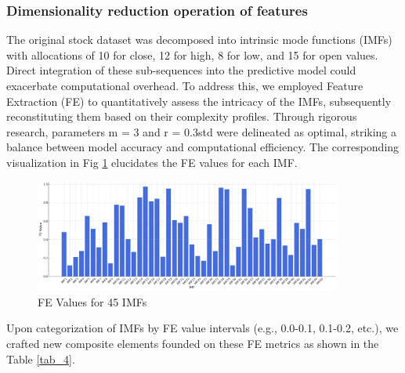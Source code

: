 \documentclass[sn-mathphys,Numbered]{sn-jnl}
\theoremstyle{thmstyleone}%
\theoremstyle{thmstyletwo}%
\theoremstyle{thmstylethree}%
\begin{document}
\subsubsection{Dimensionality reduction operation of features}\label{subsubsec2}

The original stock dataset was decomposed into intrinsic mode functions (IMFs) with allocations of 10 for close, 12 for high, 8 for low, and 15 for open values. Direct integration of these sub-sequences into the predictive model could exacerbate computational overhead. To address this, we employed Feature Extraction (FE) to quantitatively assess the intricacy of the IMFs, subsequently reconstituting them based on their complexity profiles. Through rigorous research, parameters m = 3 and r = 0.3std were delineated as optimal, striking a balance between model accuracy and computational efficiency. The corresponding visualization in Fig \ref{FE} elucidates the FE values for each IMF.
\begin{figure}[h]
    \centering
    \includegraphics[width=0.9\textwidth]{pngs/FE.png}
    \caption{ FE Values for 45 IMFs}
    \label{FE}
\end{figure}




Upon categorization of IMFs by FE value intervals (e.g., 0.0-0.1, 0.1-0.2, etc.), we crafted new composite elements founded on these FE metrics as shown in the Table \ref{tab_4}.
\end{document}
